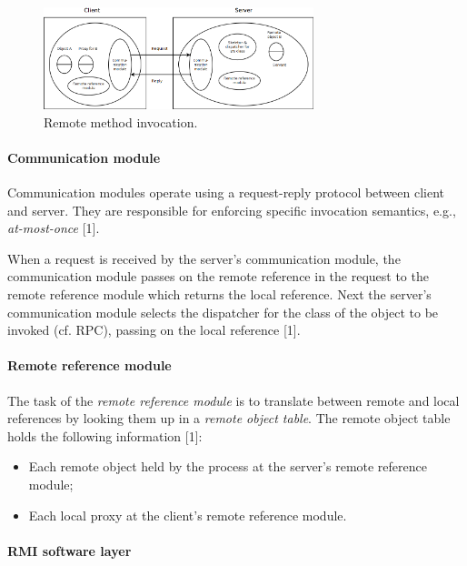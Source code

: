 \begin{figure}
	\begin{center}
		\includegraphics[width=0.7\textwidth]{img/rmi}
	\end{center}
	\caption{Remote method invocation.}
	\label{fig:rmi}
\end{figure}


\paragraph{Communication module}

Communication modules operate using a request-reply protocol between client and server. They are responsible for enforcing specific invocation semantics, e.g., \textit{at-most-once} [1].

When a request is received by the server's communication module, the communication module passes on the remote reference in the request to the remote reference module which returns the local reference. Next the server's communication module selects the dispatcher for the class of the object to be invoked (cf. RPC), passing on the local reference [1].


\paragraph{Remote reference module}

The task of the \emph{remote reference module} is to translate between remote and local references by looking them up in a \emph{remote object table}. The remote object table holds the following information [1]:
\begin{itemize}
	\item Each remote object held by the process at the server's remote reference module;
	\item Each local proxy at the client's remote reference module.
\end{itemize}


\paragraph{RMI software layer}

